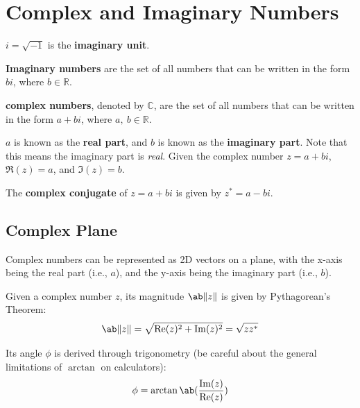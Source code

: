 \documentclass[a4paper, titlepage]{book}
\begin{document}
\frontmatter

\tableofcontents \label{contents}

\mainmatter









\appendix

\chapter{Complex and Imaginary Numbers}
\label{chap:complex-and-imaginary-numbers}

\(i = \sqrt{-1}\) is the \textbf{imaginary unit}.

\textbf{Imaginary numbers} are the set of all numbers that can be
written in the form \(bi\),
where \(b \in \mathbb{R}\).

\textbf{complex numbers}, denoted by \(\mathbb{C}\),
are the set of all numbers that can be written in the form \(a + bi\),
where \(a,~b \in \mathbb{R}\).

\(a\) is known as the \textbf{real part},
and \(b\) is known as the \textbf{imaginary part}.
Note that this means the imaginary part is \emph{real}.
Given the complex number \(z = a + bi\),
\(\Re(z) = a\), and \(\Im(z) = b\).

The \textbf{complex conjugate} of \(z = a + bi\) is given by \(z^* = a - bi\).

\section{Complex Plane}

Complex numbers can be represented as 2D vectors on a plane,
with the x-axis being the real part (i.e., \(a\)),
and the y-axis being the imaginary part (i.e., \(b\)).

Given a complex number \(z\),
its magnitude \(\ab\|z\|\) is given by Pythagorean's Theorem:
\begin{equation}
    \ab\|z\|
    = \sqrt{\Re(z)^2 + \Im(z)^2}
    = \sqrt{z z^*}
\end{equation}

Its angle \(\phi\) is derived through trigonometry
(be careful about the general limitations of \(\arctan\) on calculators):
\begin{equation}
    \phi = \arctan\ab(\frac{\Im(z)}{\Re(z)})
\end{equation}
\end{document}
